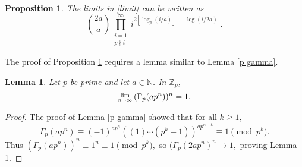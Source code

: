 \documentclass[12pt, letter]{article}    %
\theoremstyle{plain}
\newtheorem{lemma}[theorem]{Lemma}
\newtheorem{proposition}[theorem]{Proposition}
\theoremstyle{definition}
\numberwithin{equation}{section}
\newcommand{\Lim}[1]{\raisebox{0.5ex}{\scalebox{0.8}{$\displaystyle \lim_{#1}\;$}}}
\newcommand{\integers}{\mathbb{Z}}
\newcommand{\naturals}{\mathbb{N}}
\newcommand{\lemref}[1]{Lemma \ref{#1}}
\newcommand{\propref}[1]{Proposition \ref{#1}}
\newcommand{\thlabel}[1]{\label{#1}}
\providecommand{\floor}[1]{\left \lfloor #1 \right \rfloor }
\begin{document}
\begin{proposition}\thlabel{re limit}  The limits in \eqref{limit} can be written as
$$\binom{2a}{a}\prod_{\substack{i=1\\p\nmid i}}^{\infty}i^{2\floor{\log_p(i/a)}-\lfloor{\log(i/2a)}\rfloor}.$$
\end{proposition} 

\noindent The proof of \propref{re limit} requires a lemma similar to \lemref{p gamma}.

\begin{lemma}\thlabel{p gamma n}
Let $p$ be prime and let $a\in\naturals$. In $\integers_p$, $$\Lim{n\rightarrow\infty}(\Gamma_p(ap^n))^n=1.$$
\end{lemma}

\begin{proof} The proof of \lemref{p gamma} showed that for all $k\geq 1,$
$$\Gamma_p(ap^n)\equiv(-1)^{ap^n}((1)\cdots(p^k-1))^{ap^{n-k}}\equiv1\pmod{p^k}.$$ Thus
$(\Gamma_p(ap^n))^n\equiv 1^n\equiv 1\pmod{p^k},$ so $(\Gamma_p(2ap^n)^n\rightarrow1,$ proving \lemref{p gamma n}.
\end{proof}
\end{document}

